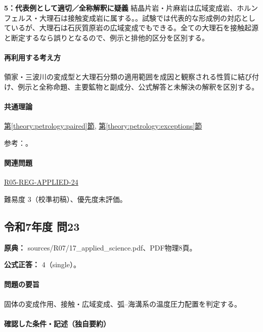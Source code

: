 \noindent\textbf{5：代表例として適切／全称解釈に疑義} 結晶片岩・片麻岩は広域変成岩、ホルンフェルス・大理石は接触変成岩に属する。。試験では代表的な形成例の対応としているが、大理石は石灰質原岩の広域変成でもできる。全ての大理石を接触起源と断定するなら誤りとなるので、例示と排他的区分を区別する。\par

\paragraph{再利用する考え方} 領家・三波川の変成型と大理石分類の適用範囲を成因と観察される性質に結び付け、例示と全称命題、主要鉱物と副成分、公式解答と未解決の解釈を区別する。

\paragraph{共通理論} \hyperref[theory:petrology:paired]{第\ref*{theory:petrology:paired}節}, \hyperref[theory:petrology:exceptions]{第\ref*{theory:petrology:exceptions}節}

\par 参考：\cite{aist_awa2021,nelson_regional2011,nelson_contact2011}。

\paragraph{関連問題} \hyperref[q:r05-reg-applied-24]{R05-REG-APPLIED-24}

\par 難易度 3（校準初稿）、優先度未評価。

\subsection{令和7年度 問23}
\label{q:r07-reg-applied-23}

\noindent\textbf{原典：} sources/R07/17\_applied\_science.pdf、PDF物理8頁。

\textbf{公式正答：} 4（single）。

\paragraph{問題の要旨} 固体の変成作用、接触・広域変成、弧–海溝系の温度圧力配置を判定する。

\paragraph{確認した条件・記述（独自要約）}\mbox{}\par

